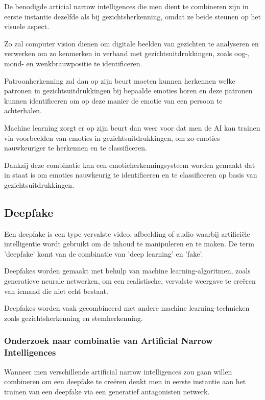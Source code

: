 De benodigde articial narrow intelligences die men dient te combineren zijn in eerste instantie dezelfde als bij gezichtsherkenning, omdat ze beide steunen op het visuele aspect.

Zo zal computer vision dienen om digitale beelden van gezichten te analyseren en verwerken om zo kenmerken in verband met gezichtsuitdrukkingen, zoals oog-, mond- en wenkbrauwpositie te identificeren.

Patroonherkenning zal dan op zijn beurt moeten kunnen herkennen welke patronen in gezichtsuitdrukkingen bij bepaalde emoties horen en deze patronen kunnen identificeren om op deze manier de emotie van een persoon te achterhalen.

Machine learning zorgt er op zijn beurt dan weer voor dat men de AI kan trainen via voorbeelden van emoties in gezichtsuitdrukkingen, om zo emoties nauwkeuriger te herkennen en te classificeren.

Dankzij deze combinatie kan een emotieherkenningsysteem worden gemaakt dat in staat is om emoties nauwkeurig te identificeren en te classificeren op basis van gezichtsuitdrukkingen.

\subsection{Deepfake}

Een deepfake is een type vervalste video, afbeelding of audio waarbij artificiële intelligentie wordt gebruikt om de inhoud te manipuleren en te maken. De term 'deepfake' komt van de combinatie van 'deep learning' en 'fake'.

Deepfakes worden gemaakt met behulp van machine learning-algoritmen, zoals generatieve neurale netwerken, om een ​​realistische, vervalste weergave te creëren van iemand die niet echt bestaat.

Deepfakes worden vaak gecombineerd met andere machine learning-technieken zoals gezichtsherkenning en stemherkenning.

\subsubsection{Onderzoek naar combinatie van Artificial Narrow Intelligences}

Wanneer men verschillende artificial narrow intelligences zou gaan willen combineren om een deepfake te creëren denkt men in eerste instantie aan het trainen van een deepfake via een generatief antagonisten netwerk.

